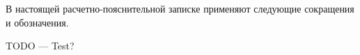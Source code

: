 
В настоящей расчетно-пояснительной записке применяют следующие сокращения и обозначения.\\

\begin{description}	
	\item{TODO} --- Test?
\end{description}
